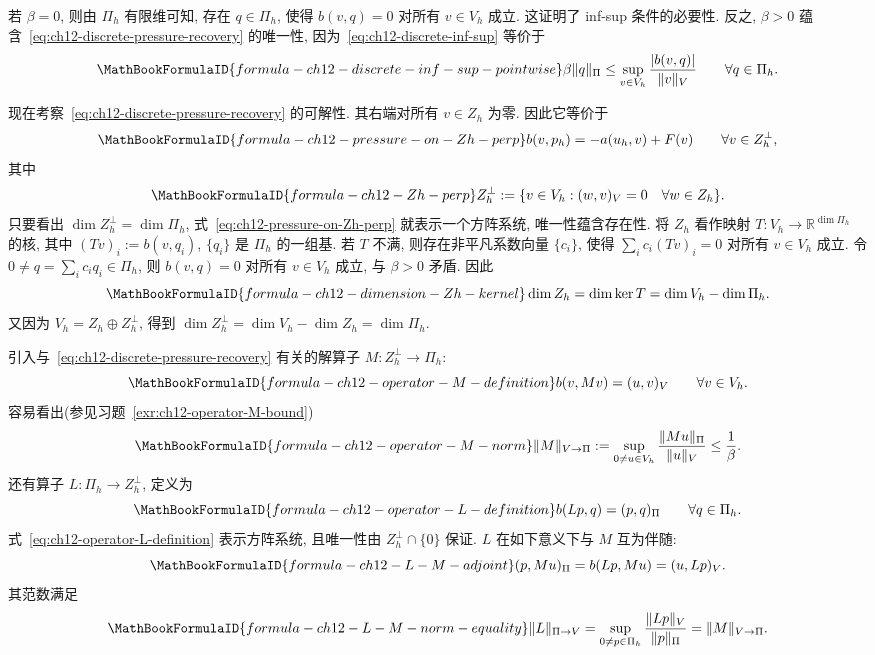 \begin{Proof}
若 $\beta=0$, 则由 $\Pi_h$ 有限维可知, 存在 $q\in\Pi_h$, 使得 $b(v,q)=0$ 对所有 $v\in V_h$ 成立. 这证明了 inf-sup 条件的必要性. 反之, $\beta>0$ 蕴含~\eqref{eq:ch12-discrete-pressure-recovery} 的唯一性, 因为~\eqref{eq:ch12-discrete-inf-sup} 等价于
\begin{equation}
\MathBookFormulaID{formula-ch12-discrete-inf-sup-pointwise}
\label{eq:ch12-discrete-inf-sup-pointwise}
\beta\|q\|_\Pi\leq\sup_{v\in V_h}\frac{|b(v,q)|}{\|v\|_V}
\qquad\forall q\in\Pi_h.
\end{equation}

现在考察~\eqref{eq:ch12-discrete-pressure-recovery} 的可解性. 其右端对所有 $v\in Z_h$ 为零. 因此它等价于
\begin{equation}
\MathBookFormulaID{formula-ch12-pressure-on-Zh-perp}
\label{eq:ch12-pressure-on-Zh-perp}
b(v,p_h)=-a(u_h,v)+F(v)\qquad\forall v\in Z_h^\perp,
\end{equation}
其中
\begin{equation}
\MathBookFormulaID{formula-ch12-Zh-perp}
\label{eq:ch12-Zh-perp}
Z_h^\perp:=\{v\in V_h:(w,v)_V=0\quad\forall w\in Z_h\}.
\end{equation}
只要看出 $\dim Z_h^\perp=\dim\Pi_h$, 式~\eqref{eq:ch12-pressure-on-Zh-perp} 就表示一个方阵系统, 唯一性蕴含存在性. 将 $Z_h$ 看作映射
$T:V_h\to\mathbb R^{\dim\Pi_h}$ 的核, 其中
$(Tv)_i:=b(v,q_i)$, $\{q_i\}$ 是 $\Pi_h$ 的一组基. 若 $T$ 不满, 则存在非平凡系数向量 $\{c_i\}$, 使得
$\sum_i c_i(Tv)_i=0$ 对所有 $v\in V_h$ 成立. 令
$0\neq q=\sum_i c_iq_i\in\Pi_h$, 则 $b(v,q)=0$ 对所有 $v\in V_h$ 成立, 与 $\beta>0$ 矛盾. 因此
\[
\MathBookFormulaID{formula-ch12-dimension-Zh-kernel}
\dim Z_h=\dim\ker T=\dim V_h-\dim\Pi_h.
\]
又因为 $V_h=Z_h\oplus Z_h^\perp$, 得到
$\dim Z_h^\perp=\dim V_h-\dim Z_h=\dim\Pi_h$.
\end{Proof}

引入与~\eqref{eq:ch12-discrete-pressure-recovery} 有关的解算子 $M:Z_h^\perp\to\Pi_h$:
\begin{equation}
\MathBookFormulaID{formula-ch12-operator-M-definition}
\label{eq:ch12-operator-M-definition}
b(v,Mv)=(u,v)_V\qquad\forall v\in V_h.
\end{equation}
容易看出(参见习题~\ref{exr:ch12-operator-M-bound})
\[
\MathBookFormulaID{formula-ch12-operator-M-norm}
\|M\|_{V\to\Pi}:=\sup_{0\neq u\in V_h}
\frac{\|Mu\|_\Pi}{\|u\|_V}\leq\frac1\beta.
\]
还有算子 $L:\Pi_h\to Z_h^\perp$, 定义为
\begin{equation}
\MathBookFormulaID{formula-ch12-operator-L-definition}
\label{eq:ch12-operator-L-definition}
b(Lp,q)=(p,q)_\Pi\qquad\forall q\in\Pi_h.
\end{equation}
式~\eqref{eq:ch12-operator-L-definition} 表示方阵系统, 且唯一性由 $Z_h^\perp\cap\{0\}$ 保证. $L$ 在如下意义下与 $M$ 互为伴随:
\begin{equation}
\MathBookFormulaID{formula-ch12-L-M-adjoint}
\label{eq:ch12-L-M-adjoint}
(p,Mu)_\Pi=b(Lp,Mu)=(u,Lp)_V.
\end{equation}
其范数满足
\[
\MathBookFormulaID{formula-ch12-L-M-norm-equality}
\|L\|_{\Pi\to V}
=\sup_{0\neq p\in\Pi_h}\frac{\|Lp\|_V}{\|p\|_\Pi}
=\|M\|_{V\to\Pi}.
\]

